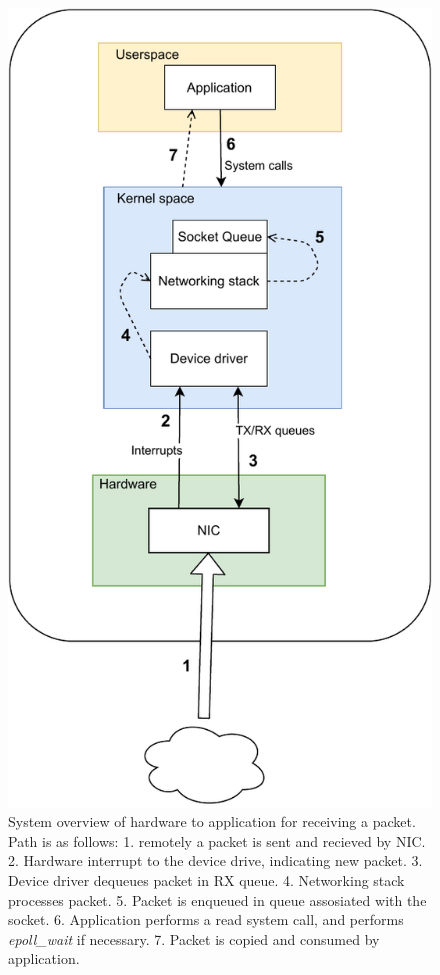 \begin{figure}
    \centering
    \includegraphics{figures/PDF/receive_path}
    \caption[System overview of hardware to application for receiving a packet.]{System overview of hardware to application for receiving a packet. Path is as follows: 1. remotely a packet is sent and recieved by NIC. 2. Hardware interrupt to the device drive, indicating new packet. 3. Device driver dequeues packet in RX queue. 4. Networking stack processes packet. 5. Packet is enqueued in queue assosiated with the socket. 6. Application performs a read system call, and performs \textit{epoll\_wait} if necessary. 7. Packet is copied and consumed by application.}
    \label{fig:linux_packet}
\end{figure}


